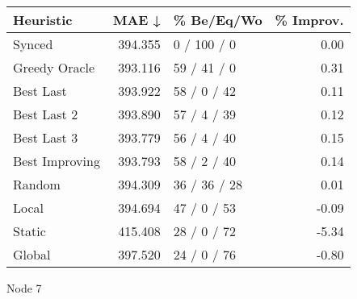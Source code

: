 \begin{tabular}{lrlr}
\toprule
\textbf{Heuristic} & \textbf{MAE ↓} & \textbf{\% Be/Eq/Wo} & \textbf{\% Improv.} \\
\midrule
            Synced &        394.355 &          0 / 100 / 0 &                0.00 \\
     Greedy Oracle &        393.116 &          59 / 41 / 0 &                0.31 \\
         Best Last &        393.922 &          58 / 0 / 42 &                0.11 \\
       Best Last 2 &        393.890 &          57 / 4 / 39 &                0.12 \\
       Best Last 3 &        393.779 &          56 / 4 / 40 &                0.15 \\
    Best Improving &        393.793 &          58 / 2 / 40 &                0.14 \\
            Random &        394.309 &         36 / 36 / 28 &                0.01 \\
             Local &        394.694 &          47 / 0 / 53 &               -0.09 \\
            Static &        415.408 &          28 / 0 / 72 &               -5.34 \\
            Global &        397.520 &          24 / 0 / 76 &               -0.80 \\
\bottomrule
\end{tabular}
\caption{Node 7}
\label{tab:iid_lr01_le2_bs4_7}

